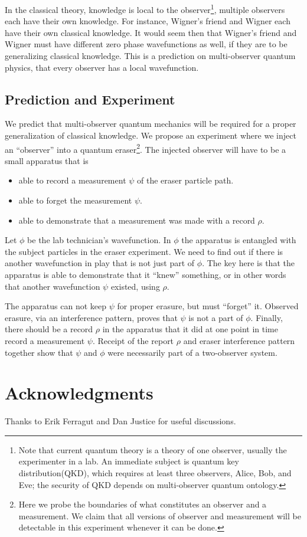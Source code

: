 \documentclass[12pt,a4paper]{article}
\begin{document}
In the classical theory, knowledge is local to the observer\footnote{Note that current quantum theory is a theory of one observer, usually the experimenter in a lab.  An immediate subject is quantum key distribution(QKD), which requires at least three observers, Alice, Bob, and Eve; the security of QKD depends on multi-observer quantum ontology.}, multiple observers each have their own knowledge.  For instance, Wigner's friend and Wigner each have their own classical knowledge.  It would seem then that Wigner's friend and Wigner must have different zero phase wavefunctions as well, if they are to be generalizing classical knowledge.  This is a prediction on multi-observer quantum physics, that every observer has a local wavefunction. 

\subsection{Prediction and Experiment}

We predict that multi-observer quantum mechanics will be required for a proper generalization of classical knowledge.  We propose an experiment where we inject an ``observer'' into a quantum eraser\footnote{Here we probe the boundaries of what constitutes an observer and a measurement.  We claim that all versions of observer and measurement will be detectable in this experiment whenever it can be done.}.  The injected observer will have to be a small apparatus that is
\begin{itemize}
   \item able to record a measurement $\psi$ of the eraser particle path.
   \item able to forget the measurement $\psi$.
   \item able to demonstrate that a measurement was made with a record $\rho$.
\end{itemize}
Let $\phi$ be the lab technician's wavefunction.  In $\phi$ the apparatus is entangled with the subject particles in the eraser experiment.  We need to find out if there is another wavefunction in play that is not just part of $\phi$.  The key here is that the apparatus is able to demonstrate that it ``knew'' something, or in other words that another wavefunction $\psi$ existed, using $\rho$.

The apparatus can not keep $\psi$ for proper erasure, but must ``forget'' it.  Observed erasure, via an interference pattern, proves that $\psi$ is not a part of $\phi$.  Finally, there should be a record $\rho$ in the apparatus that it did at one point in time record a measurement $\psi$.  Receipt of the report $\rho$ and eraser interference pattern together show that $\psi$ and $\phi$ were necessarily part of a two-observer system.

\section{Acknowledgments}
Thanks to Erik Ferragut and Dan Justice for useful discussions.



\end{document}
